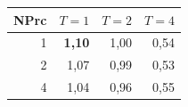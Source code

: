 \begin{tabular}{@{}rrrr@{}}
\toprule
NPrc & $T=1$ & $T=2$ & $T=4$ \\
\midrule
1 & \textbf{1{,}10} & 1{,}00 & 0{,}54 \\
2 & 1{,}07 & 0{,}99 & 0{,}53 \\
4 & 1{,}04 & 0{,}96 & 0{,}55 \\
\bottomrule
\end{tabular}
